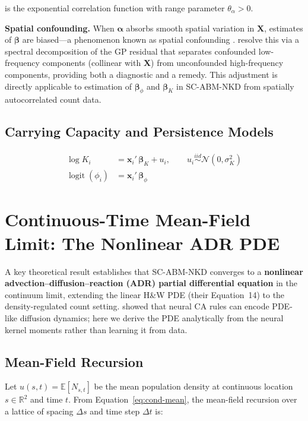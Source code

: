 \documentclass[12pt,a4paper]{article}
\theoremstyle{definition}
\newcommand{\E}{\mathbb{E}}
\newcommand{\N}{\mathcal{N}}
\newcommand{\bx}{\bm{x}}
\newcommand{\bX}{\bm{X}}
\newcommand{\bbeta}{\bm{\beta}}
\newcommand{\balpha}{\bm{\alpha}}
\begin{document}
is the exponential correlation function with range parameter $\theta_\alpha > 0$.

\noindent\textbf{Spatial confounding.}
When $\balpha$ absorbs smooth spatial variation in $\bX$, estimates of $\bbeta$
are biased---a phenomenon known as spatial confounding \citep{guan2023}.
\citet{guan2023} resolve this via a spectral decomposition of the GP residual
that separates confounded low-frequency components (collinear with $\bX$) from
unconfounded high-frequency components, providing both a diagnostic and a remedy.
This adjustment is directly applicable to estimation of $\bbeta_\phi$ and $\bbeta_K$
in SC-ABM-NKD from spatially autocorrelated count data.

\subsection{Carrying Capacity and Persistence Models}

\begin{align}
  \log K_i &= \bx_i'\, \bbeta_K + u_i,
  \qquad u_i \stackrel{iid}{\sim} \N(0, \sigma_K^2)
  \label{eq:capacity-model} \\[4pt]
  \operatorname{logit}(\phi_i) &= \bx_i'\, \bbeta_\phi
  \label{eq:persistence-model}
\end{align}

\section{Continuous-Time Mean-Field Limit: The Nonlinear ADR PDE}
\label{sec:pde}

A key theoretical result establishes that SC-ABM-NKD converges to a
\textbf{nonlinear advection--diffusion--reaction (ADR) partial differential
equation} in the continuum limit, extending the linear H\&W PDE (their
Equation~14) to the density-regulated count setting.
\citet{richardson2024} showed that neural CA rules can encode PDE-like
diffusion dynamics; here we derive the PDE analytically from the neural
kernel moments rather than learning it from data.

\subsection{Mean-Field Recursion}

Let $u(s,t) = \E[N_{s,t}]$ be the mean population density at continuous
location $s \in \mathbb{R}^2$ and time $t$.  From Equation~\eqref{eq:cond-mean},
the mean-field recursion over a lattice of spacing $\Delta s$ and time step
$\Delta t$ is:
\end{document}
